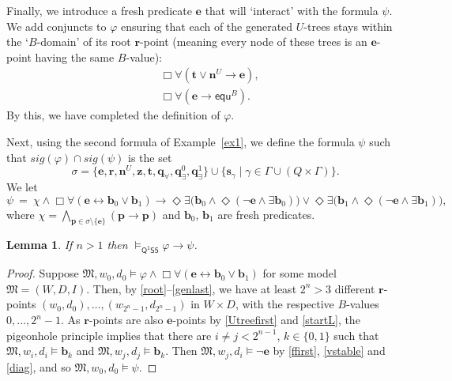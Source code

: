 \documentclass[10pt,a4paper]{amsart}
\theoremstyle{plain}
\newtheorem{lem}[thm]{Lemma}
\theoremstyle{definition}
\newcommand{\diag}{\fform{e}}
\newcommand{\sig}{\mathit{sig}}
\newcommand{\FOMS}{\ensuremath{\mathsf{Q^1S5}}}
\newcommand{\fform}[1]{\boldsymbol{#1}}
\newcommand{\pvar}{\fform{p}}
\newcommand{\qvar}{\fform{q}}
\newcommand{\svar}{\fform{s}}
\newcommand{\bvar}{\fform{b}}
\newcommand{\hvar}{\fform{h}}
\newcommand{\vvar}{\fform{v}}
\newcommand{\Zvar}{\fform{z}}
\newcommand{\cR}{B}
\newcommand{\cU}{U}
\newcommand{\nextU}{\fform{n}^\cU}
\newcommand{\Bv}{\forall}
\newcommand{\Bh}{\Box}
\newcommand{\Dv}{\exists}
\newcommand{\Dh}{\Diamond}
\newcommand{\start}{\fform{r}}
\newcommand{\grid}{\mathsf{equ}}
\newcommand{\tree}{\fform{t}}
\newcommand{\qA}{\qvar_\forall}
\newcommand{\qE}{\qvar_\exists}
\begin{document}
	Finally, we introduce a fresh predicate $\diag$ that will `interact' with the formula $\psi$. We add conjuncts to $\varphi$ ensuring that 
	each of the generated $\cU$-trees stays within the 
	`$\cR$-domain' of its root $\start$-point
	(meaning every node of these trees is an $\diag$-point having the same $\cR$-value): 
	\begin{align}
		\label{startL}
		& \Bh\Bv(\tree\lor\nextU\to\diag),\\
		\label{diag}
		& \Bh\Bv(\diag\to\grid^\cR).
	\end{align}
	By this, we have completed the definition of $\varphi$.
	
	Next, using the second formula of Example~\ref{ex1}, we define the formula $\psi$ such that $\sig(\varphi)\cap\sig(\psi)$ is the set
	\[
	\sigma=\bigl\{\diag,\start,\nextU,\Zvar,\tree,\qA,\qE^0,\qE^1\bigr\}\cup
	\bigl\{\svar_\gamma\mid\gamma\in\Gamma\cup(Q\times\Gamma)\bigr\}.
	\]
	We let
	$$
	\psi ~=~  \chi\land\Bh\Bv (\diag \leftrightarrow  \bvar_0 \lor \bvar_1) \to  \Dh\Dv  \bigl(\bvar_0 \land \Dh (\neg \diag \land \Dv  \bvar_0)\bigr) \lor{} 
	\Dh\Dv  \bigl(\bvar_1 \land \Dh (\neg \diag \land \Dv  \bvar_1)\bigr),
	$$
	where %
	$\chi=\bigwedge_{\pvar\in\sigma\mathop{\setminus}\{\diag\}}(\pvar\to\pvar)$
	and $\bvar_0$, $\bvar_1$ are fresh predicates.
	
	\begin{lem}\label{l:impvalid}
		If $n>1$ then $\models_{\FOMS}\varphi\to\psi$.
	\end{lem}
%	
	\begin{proof}
		Suppose $\mathfrak M,w_0,d_0\models\varphi\land\Bh\Bv(\diag\leftrightarrow \bvar_0\lor \bvar_1)$ for some model $\mathfrak M=(W,D,I)$. Then, by \eqref{root}--\eqref{genlast}, we have at least $2^n\mathop{>} 3$ different $\start$-points $(w_0,d_0), \dots,(w_{2^n-1},d_{2^n-1})$ in $W\times D$, with the respective
		$\cR$-values $0,\dots,2^n\mathop{-}1$.
		As $\start$-points are also $\diag$-points by \eqref{Utreefirst} and \eqref{startL},
		the pigeonhole principle implies that there are $i\ne j<2^{n-1}$, $k\in\{0,1\}$ such that $\mathfrak M,w_i,d_i\models \bvar_k$ and $\mathfrak M,w_j,d_j\models \bvar_k$.
		Then $\mathfrak M,w_j,d_i\models\neg\diag$ by 
		\eqref{ffirst}, \eqref{vstable} and \eqref{diag}, 
		and so  $\mathfrak M,w_0,d_0\models\psi$.
	\end{proof}
	
\end{document}
